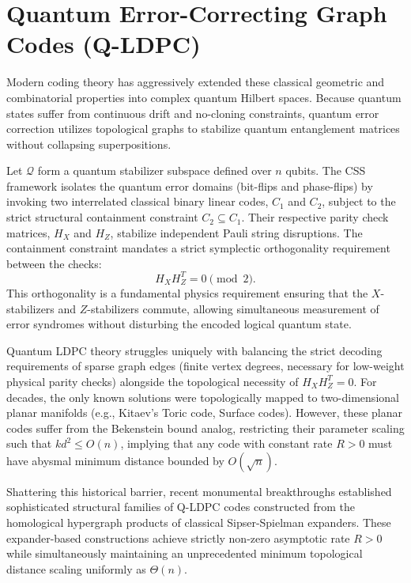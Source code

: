 \section{Quantum Error-Correcting Graph Codes (Q-LDPC)}

Modern coding theory has aggressively extended these classical geometric and combinatorial properties into complex quantum Hilbert spaces. Because quantum states suffer from continuous drift and no-cloning constraints, quantum error correction utilizes topological graphs to stabilize quantum entanglement matrices without collapsing superpositions.

\begin{definition}
Let $\mathcal{Q}$ form a quantum stabilizer subspace defined over $n$ qubits. The CSS framework isolates the quantum error domains (bit-flips and phase-flips) by invoking two interrelated classical binary linear codes, $C_1$ and $C_2$, subject to the strict structural containment constraint $C_2 \subseteq C_1$. 
Their respective parity check matrices, $H_X$ and $H_Z$, stabilize independent Pauli string disruptions. The containment constraint mandates a strict symplectic orthogonality requirement between the checks:
\[
H_X H_Z^T = 0 \pmod 2.
\]
This orthogonality is a fundamental physics requirement ensuring that the $X$-stabilizers and $Z$-stabilizers commute, allowing simultaneous measurement of error syndromes without disturbing the encoded logical quantum state.
\end{definition}

Quantum LDPC theory struggles uniquely with balancing the strict decoding requirements of sparse graph edges (finite vertex degrees, necessary for low-weight physical parity checks) alongside the topological necessity of $H_X H_Z^T = 0$. For decades, the only known solutions were topologically mapped to two-dimensional planar manifolds (e.g., Kitaev's Toric code, Surface codes). However, these planar codes suffer from the Bekenstein bound analog, restricting their parameter scaling such that $k d^2 \le O(n)$, implying that any code with constant rate $R > 0$ must have abysmal minimum distance bounded by $O(\sqrt{n})$.

\begin{theorem}
Shattering this historical barrier, recent monumental breakthroughs established sophisticated structural families of Q-LDPC codes constructed from the homological hypergraph products of classical Sipser-Spielman expanders. These expander-based constructions achieve strictly non-zero asymptotic rate $R > 0$ while simultaneously maintaining an unprecedented minimum topological distance scaling uniformly as $\Theta(n)$.
\end{theorem}


